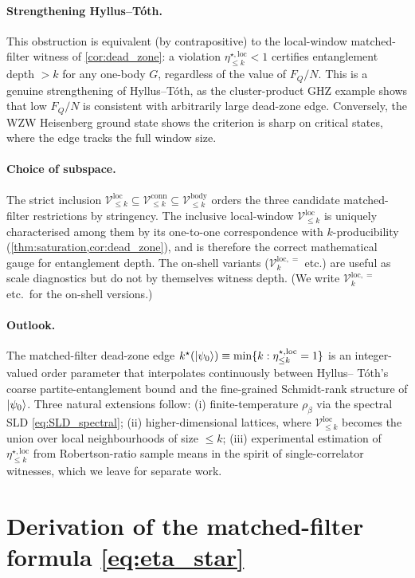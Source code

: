 \documentclass[11pt,a4paper]{article}
\newcommand{\FQ}{F_Q}
\newcommand{\PsiZ}{\ket{\psi_0}}
\newcommand{\Vbody}[1]{\mathcal{V}^{\mathrm{body}}_{\le #1}}
\newcommand{\Vconn}[1]{\mathcal{V}^{\mathrm{conn}}_{\le #1}}
\newcommand{\Vloc}[1]{\mathcal{V}^{\mathrm{loc}}_{\le #1}}
\newcommand{\etaloc}[1]{\eta^{\star,\mathrm{loc}}_{\le #1}}
\begin{document}
\paragraph{Strengthening Hyllus--T\'oth.}  This obstruction is
equivalent (by contrapositive) to the local-window
matched-filter witness of \cref{cor:dead_zone}: a violation
$\etaloc{k}<1$ certifies entanglement depth $>k$ for any one-body
$G$, regardless of the value of $\FQ/N$.  This is a genuine
strengthening of Hyllus--T\'oth, as the cluster-product GHZ
example shows that low $\FQ/N$ is consistent with arbitrarily
large dead-zone edge.  Conversely, the WZW Heisenberg ground
state shows the criterion is sharp on critical states, where the
edge tracks the full window size.

\paragraph{Choice of subspace.}  The strict inclusion
$\Vloc{k}\subseteq\Vconn{k}\subseteq\Vbody{k}$ orders the three
candidate matched-filter restrictions by stringency.  The
inclusive local-window $\Vloc{k}$ is uniquely characterised among
them by its one-to-one correspondence with $k$-producibility
(\cref{thm:saturation,cor:dead_zone}), and is therefore the
correct mathematical gauge for entanglement depth.  The
on-shell variants ($\mathcal V^{\mathrm{loc},=}_{k}$ etc.) are useful as scale
diagnostics but do not by themselves witness depth.  (We write
$\mathcal V^{\mathrm{loc},=}_{k}$ etc.\ for the on-shell versions.)

\paragraph{Outlook.}  The matched-filter dead-zone edge
$k^\star(\PsiZ)\equiv\min\{k:\etaloc{k}=1\}$ is an integer-valued
order parameter that interpolates continuously between Hyllus--
T\'oth's coarse partite-entanglement bound and the fine-grained
Schmidt-rank structure of $\PsiZ$.  Three natural extensions
follow: (i) finite-temperature $\rho_\beta$ via the spectral SLD
\eqref{eq:SLD_spectral}; (ii) higher-dimensional lattices, where
$\Vloc{k}$ becomes the union over local neighbourhoods of size
$\le k$; (iii) experimental estimation of $\etaloc{k}$ from
Robertson-ratio sample means in the spirit of single-correlator
witnesses, which we leave for separate work.

\appendix
\section{Derivation of the matched-filter formula \eqref{eq:eta_star}}
\label{app:matched}
\end{document}
